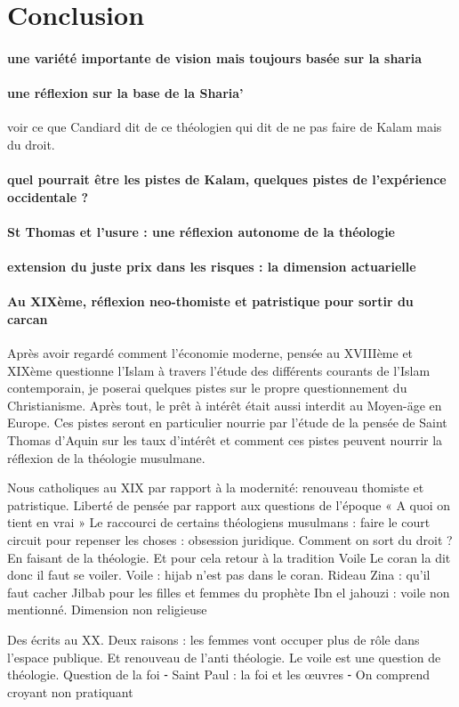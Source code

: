 \section{Conclusion}

\paragraph{une variété importante de vision mais toujours basée sur la sharia}

\paragraph{une réflexion sur la base de la Sharia'}
voir ce que Candiard dit de ce théologien qui dit de ne pas faire de Kalam mais du droit.

\paragraph{quel pourrait être les pistes de Kalam, quelques pistes de l'expérience occidentale ?}

\paragraph{St Thomas et l'usure : une réflexion autonome de la théologie}

\paragraph{extension du juste prix dans les risques : la dimension actuarielle}
\paragraph{Au XIXème, réflexion neo-thomiste et patristique pour sortir du carcan}
Après avoir regardé comment l'économie moderne, pensée au XVIIIème et XIXème questionne l'Islam à travers l'étude des différents courants de l'Islam contemporain, je poserai quelques pistes sur le propre questionnement du Christianisme. Après tout, le prêt à intérêt était aussi interdit au Moyen-äge en Europe. Ces pistes seront en particulier nourrie par l'étude de la pensée de Saint Thomas d'Aquin sur les taux d'intérêt et comment ces pistes peuvent nourrir la réflexion de la théologie musulmane. 

Nous catholiques au XIX par rapport à la modernité: renouveau thomiste et patristique. Liberté de pensée par rapport aux questions de l’époque
« A quoi on tient en vrai »
Le raccourci de certains théologiens musulmans : faire le court circuit pour repenser les choses : obsession juridique. Comment on sort du droit ? En faisant de la théologie. Et pour cela retour à la tradition
Voile
Le coran la dit donc il faut se voiler. Voile : hijab n’est pas dans le coran. Rideau
Zina : qu’il faut cacher
Jilbab pour les filles et femmes du prophète 
Ibn el jahouzi : voile non mentionné. Dimension non religieuse

Des écrits au XX. Deux raisons : les femmes vont occuper plus de rôle dans l’espace publique.
Et renouveau de l’anti théologie. Le voile est une question de théologie. Question de la foi
	⁃	Saint Paul : la foi et les œuvres
	⁃	On comprend croyant non pratiquant
	